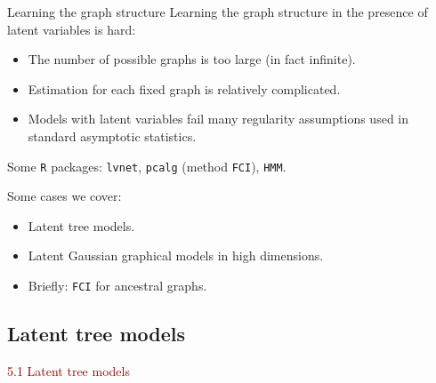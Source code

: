 \documentclass[dvipsnames,aspectratio=169]{beamer} %
\begin{document}
\begin{frame}{Learning the graph structure}
Learning the graph structure in the presence of latent variables is hard:
\begin{itemize}
	\item The number of possible graphs is too large (in fact infinite).
	\item Estimation for each fixed graph is relatively complicated.
	\item Models with latent variables fail many regularity assumptions used in standard asymptotic statistics.
\end{itemize}
\bigskip

Some \texttt{R} packages: \texttt{lvnet}, \texttt{pcalg} (method \texttt{FCI}), \texttt{HMM}. 
\begin{alertblock}{Some cases we cover:}
\begin{itemize}
	\item Latent tree models.
	\item Latent Gaussian graphical models in high dimensions.
	\item Briefly: \texttt{FCI} for ancestral graphs.
\end{itemize}
\end{alertblock}
\end{frame}

\subsection{Latent tree models}

\begin{frame}{}
\begin{center}
	{\huge \textcolor{DarkRed}{5.1 Latent tree models}}
\end{center}
\end{frame}
\end{document}
